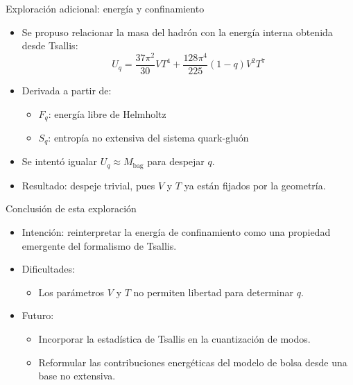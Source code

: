 \documentclass{beamer}
\begin{document}
\begin{frame}{Exploración adicional: energía y confinamiento}
  \begin{itemize}
    \item Se propuso relacionar la masa del hadrón con la energía interna obtenida desde Tsallis:
    \[
      U_q = \frac{37 \pi^2}{30} V T^4 + \frac{128 \pi^4}{225} (1 - q) V^2 T^7
    \]
    \item Derivada a partir de:
    \begin{itemize}
      \item \( F_q \): energía libre de Helmholtz
      \item \( S_q \): entropía no extensiva del sistema quark-gluón
    \end{itemize}
    \item Se intentó igualar \( U_q \approx M_{\text{bag}} \) para despejar \( q \).
    \item Resultado: despeje trivial, pues \( V \) y \( T \) ya están fijados por la geometría.
  \end{itemize}
\end{frame}

\begin{frame}{Conclusión de esta exploración}
  \begin{itemize}
    \item Intención: reinterpretar la energía de confinamiento como una propiedad emergente del formalismo de Tsallis.
    \item Dificultades:
    \begin{itemize}
      \item Los parámetros \( V \) y \( T \) no permiten libertad para determinar \( q \).
    \end{itemize}
    \item Futuro:
    \begin{itemize}
      \item Incorporar la estadística de Tsallis en la cuantización de modos.
      \item Reformular las contribuciones energéticas del modelo de bolsa desde una base no extensiva.
    \end{itemize}
  \end{itemize}
\end{frame}

\end{document}
